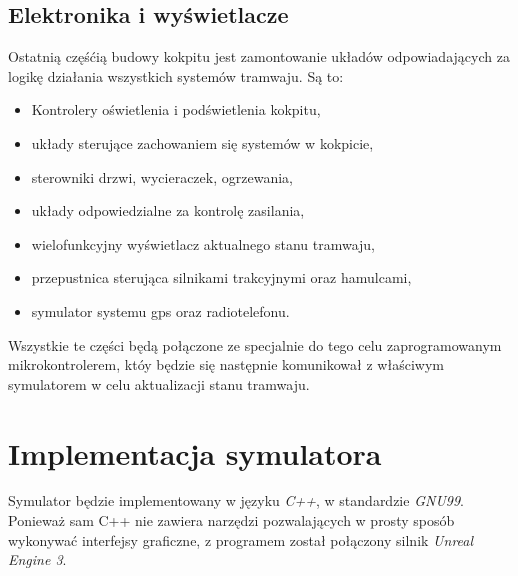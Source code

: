 \documentclass[12pt,a4paper]{article}
\begin{document}
\subsection{Elektronika i wyświetlacze}
Ostatnią częśćią budowy kokpitu jest zamontowanie układów odpowiadających za logikę działania
wszystkich systemów tramwaju. Są to:
\begin{itemize}
\item Kontrolery oświetlenia i podświetlenia kokpitu,
\item układy sterujące zachowaniem się systemów w kokpicie,
\item sterowniki drzwi, wycieraczek, ogrzewania,
\item układy odpowiedzialne za kontrolę zasilania,
\item wielofunkcyjny wyświetlacz aktualnego stanu tramwaju,
\item przepustnica sterująca silnikami trakcyjnymi oraz hamulcami,
\item symulator systemu gps oraz radiotelefonu.
\end{itemize}
Wszystkie te części będą połączone ze specjalnie do tego celu zaprogramowanym mikrokontrolerem, któy
będzie się następnie komunikował z właściwym symulatorem w celu aktualizacji stanu tramwaju.

\section{Implementacja symulatora}
Symulator będzie implementowany w języku {\it C++}, w standardzie {\it GNU99}. Ponieważ sam C++
nie zawiera narzędzi pozwalających w prosty sposób wykonywać interfejsy graficzne, z programem
został połączony silnik {\it Unreal Engine 3}.
\end{document}
